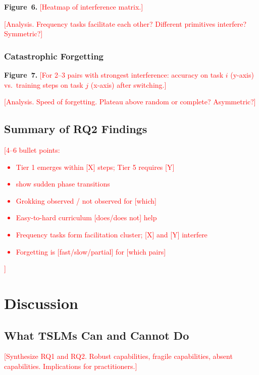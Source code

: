 \documentclass[11pt]{article}
\newcommand{\placeholder}[1]{\textcolor{red}{[#1]}}
\begin{document}
\textbf{Figure~6.} \placeholder{Heatmap of interference matrix.}

\placeholder{Analysis. Frequency tasks facilitate each other? Different primitives interfere? Symmetric?}


\subsubsection{Catastrophic Forgetting}

\textbf{Figure~7.} \placeholder{For 2--3 pairs with strongest interference: accuracy on task $i$ (y-axis) vs.\ training steps on task $j$ (x-axis) after switching.}

\placeholder{Analysis. Speed of forgetting. Plateau above random or complete? Asymmetric?}


\subsection{Summary of RQ2 Findings}

\placeholder{4--6 bullet points:
\begin{itemize}
\item Tier 1 emerges within [X] steps; Tier 5 requires [Y]
\item [These tasks] show sudden phase transitions
\item Grokking observed / not observed for [which]
\item Easy-to-hard curriculum [does/does not] help
\item Frequency tasks form facilitation cluster; [X] and [Y] interfere
\item Forgetting is [fast/slow/partial] for [which pairs]
\end{itemize}
}


\section{Discussion}
\label{sec:discussion}

\subsection{What TSLMs Can and Cannot Do}

\placeholder{Synthesize RQ1 and RQ2. Robust capabilities, fragile capabilities, absent capabilities. Implications for practitioners.}
\end{document}

